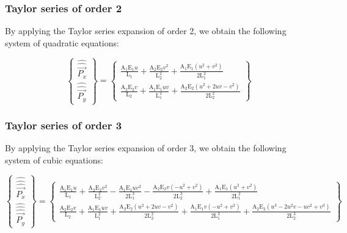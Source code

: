 \subsubsection{Taylor series of order 2}

By applying the Taylor series expansion of order 2, we obtain the following system of quadratic equations:

\begin{equation}
    \begin{Bmatrix}
        \widehat{\widehat{\vec{P_x}}} \\
        \widehat{\widehat{\vec{P_y}}}
    \end{Bmatrix}
    =
    \begin{Bmatrix}
        \frac{\text{A}_1 \text{E}_1 u}{\text{L}_1}+\frac{\text{A}_2 \text{E}_2 v^2}{\text{L}_2^2}+\frac{\text{A}_1 \text{E}_1 \left(u^2+v^2\right)}{2 \text{L}_1^2} \\
        \frac{\text{A}_2 \text{E}_2 v}{\text{L}_2}+\frac{\text{A}_1 \text{E}_1 uv}{\text{L}_1^2}+\frac{\text{A}_2 \text{E}_2 \left(u^2+2 u v-v^2\right)}{2 \text{L}_2^2}
    \end{Bmatrix}
\end{equation}


\subsubsection{Taylor series of order 3}

By applying the Taylor series expansion of order 3, we obtain the following system of cubic equations:

\begin{equation}
    \begin{Bmatrix}
        \widehat{\widehat{\widehat{\vec{P_x}}}} \\
        \widehat{\widehat{\widehat{\vec{P_y}}}}
    \end{Bmatrix}
    =
    \begin{Bmatrix}
        \frac{\text{A}_1 \text{E}_1 u}{\text{L}_1}+\frac{\text{A}_2 \text{E}_2 v^2}{\text{L}_2^2}-\frac{\text{A}_1 \text{E}_1 u v^2}{2 \text{L}_1^3}-\frac{\text{A}_2 \text{E}_2 v \left(-u^2+v^2\right)}{2 \text{L}_2^3}+\frac{\text{A}_1 \text{E}_1 \left(u^2+v^2\right)}{2 \text{L}_1^2} \\
        \frac{\text{A}_2 \text{E}_2 v}{\text{L}_2}+\frac{\text{A}_1 \text{E}_1 u v}{\text{L}_1^2}+\frac{\text{A}_2 \text{E}_2 \left(u^2+2 u v-v^2\right)}{2 \text{L}_2^2}+\frac{\text{A}_1 \text{E}_1 v \left(-u^2+v^2\right)}{2 \text{L}_1^3}+\frac{\text{A}_2 \text{E}_2 \left(u^3-2 u^2 v-u v^2+v^3\right)}{2 \text{L}_2^3}
    \end{Bmatrix}
\end{equation}


